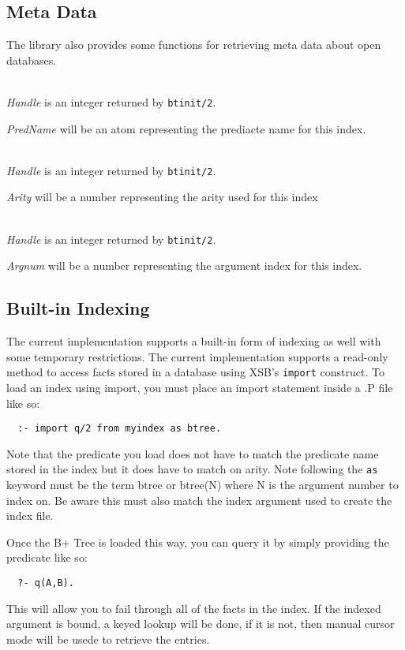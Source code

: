 \subsection{Meta Data}

The library also provides some functions for retrieving meta data about open databases.

\begin{description}

\item[btpredname({\it +Handle}, {\it -PredName})]\mbox{}
  \\
    {\it Handle} is an integer returned by {\tt btinit/2}.

    {\it PredName} will be an atom representing the prediacte name for this index.
\item[btarity({\it +Handle}, {\it -Arity})]\mbox{}
  \\
    {\it Handle} is an integer returned by {\tt btinit/2}.

    {\it Arity} will be a number representing the arity used for this index
\item[btindexon({\it +Handle}, {\it -Argnum})]\mbox{}
  \\
    {\it Handle} is an integer returned by {\tt btinit/2}.
    
    {\it Argnum} will be a number representing the argument index for this index.

\end{description}

\subsection{Built-in Indexing}

The current implementation supports a built-in form of indexing as well with some temporary restrictions. 
The current implementation supports a read-only method to access facts stored in a database using XSB's {\tt import} construct.
To load an index using import, you must place an import statement inside a .P file like so:

\begin{verbatim}
  :- import q/2 from myindex as btree.
\end{verbatim}

Note that the predicate you load does not have to match the predicate name stored in the index but it does have to match 
on arity. Note following the {\tt as} keyword must be the term btree or btree(N) where N is the argument number to index on. Be 
aware this must also match the index argument used to create the index file.

Once the B+ Tree is loaded this way, you can query it by simply providing the predicate like so:

\begin{verbatim}
  ?- q(A,B).
\end{verbatim}

This will allow you to fail through all of the facts in the index. If the indexed argument is bound, a keyed lookup will be done, if it is not,
then manual cursor mode will be usede to retrieve the entries.

